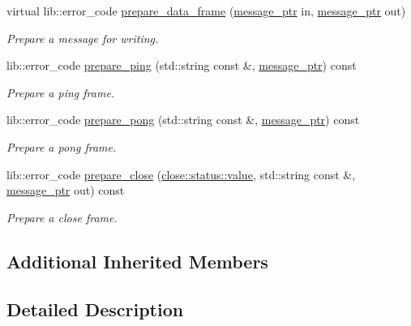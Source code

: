\begin{DoxyCompactItemize}
virtual lib\+::error\+\_\+code \hyperlink{classwebsocketpp_1_1processor_1_1hybi00_a919aaed345cab679875be1d95c7302ec}{prepare\+\_\+data\+\_\+frame} (\hyperlink{classwebsocketpp_1_1processor_1_1hybi00_a300a0810d09570108e3dd747d97a8257}{message\+\_\+ptr} in, \hyperlink{classwebsocketpp_1_1processor_1_1hybi00_a300a0810d09570108e3dd747d97a8257}{message\+\_\+ptr} out)
\begin{DoxyCompactList}\small\item\em Prepare a message for writing. \end{DoxyCompactList}\item 
lib\+::error\+\_\+code \hyperlink{classwebsocketpp_1_1processor_1_1hybi00_a8ed04552fd29c7767622d3dfb58150f5}{prepare\+\_\+ping} (std\+::string const \&, \hyperlink{classwebsocketpp_1_1processor_1_1hybi00_a300a0810d09570108e3dd747d97a8257}{message\+\_\+ptr}) const 
\begin{DoxyCompactList}\small\item\em Prepare a ping frame. \end{DoxyCompactList}\item 
lib\+::error\+\_\+code \hyperlink{classwebsocketpp_1_1processor_1_1hybi00_a88ff1e32dec69f5830ca22cf6118682d}{prepare\+\_\+pong} (std\+::string const \&, \hyperlink{classwebsocketpp_1_1processor_1_1hybi00_a300a0810d09570108e3dd747d97a8257}{message\+\_\+ptr}) const 
\begin{DoxyCompactList}\small\item\em Prepare a pong frame. \end{DoxyCompactList}\item 
lib\+::error\+\_\+code \hyperlink{classwebsocketpp_1_1processor_1_1hybi00_a2fe66914c00d52a99b46e2e3841a9134}{prepare\+\_\+close} (\hyperlink{namespacewebsocketpp_1_1close_1_1status_a8614a5c4733d708e2d2a32191c5bef84}{close\+::status\+::value}, std\+::string const \&, \hyperlink{classwebsocketpp_1_1processor_1_1hybi00_a300a0810d09570108e3dd747d97a8257}{message\+\_\+ptr} out) const 
\begin{DoxyCompactList}\small\item\em Prepare a close frame. \end{DoxyCompactList}\end{DoxyCompactItemize}
\subsection*{Additional Inherited Members}


\subsection{Detailed Description}
